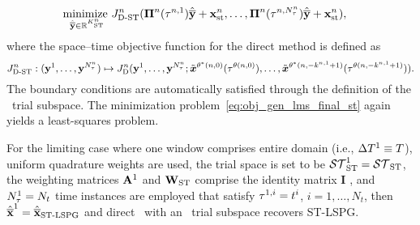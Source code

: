  \begin{equation}\label{eq:obj_gen_lms_final_st}
\begin{split}
& \underset{\stgenstatey \in \RR{\stdimArg{n}}}{\text{minimize } }
\objectiveArgLMS{n}_{\text{D-ST}} (\stbasisArg{n}{\timeWindowArg{n}{1}} \stgenstatey + \stateInterceptSTArg{n},\ldots,\stbasisArg{n}{\timeWindowArg{n}{\nstepsArg{n}}} \stgenstatey + \stateInterceptSTArg{n}),%
\end{split} 
\end{equation}
where the space--time objective function for the direct method is defined as
$$
J^{n}_{\text{D-ST}}  :  (\mathbf{y}^{1},\ldots,\mathbf{y}^{N_{\tau}^{n}}) \mapsto J^{n}_{\text{D}}(\mathbf{y}^{1},\ldots,\mathbf{y}^{N_{\tau}^{n}}; \tilde{\boldsymbol x}^{\theta^*(n,0)}(\tau^{\theta(n,0)}),\ldots, 
 \tilde{\boldsymbol x}^{\theta^*(n,-k^{n,1}+1)}(\tau^{\theta(n,-k^{n,1}+1)})).
$$
The boundary conditions are automatically satisfied through the definition of the \spaceTimeAcronym\ trial subspace. The minimization problem~\eqref{eq:obj_gen_lms_final_st} again yields a least-squares problem.
\begin{remark}
For the limiting case where one window comprises entire domain (i.e.,
	$\Delta T^{1}\equiv T$), uniform quadrature weights are used, the trial
	space is set to be $\mathcal{ ST }_{\text{ST}}^{1} = \mathcal{ ST }_{\text{ST}}$, the weighting matrices
	$\mathbf{A}^{1}$ and $\mathbf{W}_{\text{ST}}$ comprise the identity matrix
	$\mathbf{I}$ , and $N_{\tau}^{1} = N_t$ time instances are employed that
	satisfy $\tau^{1,i} = t^i$, $i=1,\ldots,N_t$, then
	$\hat{\mathbf{\overline{x}}}^{1} =  \hat{\mathbf{\overline{x}}}_\text{ST-LSPG}$ and direct \methodAcronym\
	with an \spaceTimeAcronym\ trial subspace recovers ST-LSPG. 
\end{remark}

